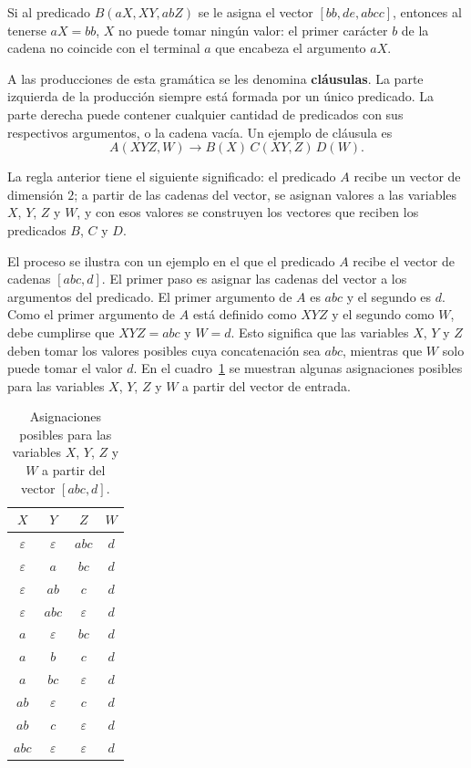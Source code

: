 \documentclass{report}
\theoremstyle{definition}
\theoremstyle{plain}
\theoremstyle{remark}
\begin{document}
Si al predicado $B(aX, XY, abZ)$ se le asigna el vector
$[bb, de, abcc]$, entonces al tenerse $aX = bb$, $X$ no puede tomar
ningún valor: el primer carácter $b$ de la cadena no coincide con el
terminal $a$ que encabeza el argumento $aX$. 

A las producciones de esta gramática se les denomina \textbf{cláusulas}.
La parte izquierda de la producción siempre está formada por un único
predicado. La parte derecha puede contener cualquier cantidad de
predicados con sus respectivos argumentos, o la cadena vacía. Un ejemplo
de cláusula es
\[
  A(XYZ, W) \to B(X)\, C(XY, Z)\, D(W).
\]

La regla anterior tiene el siguiente significado: el predicado $A$
recibe un vector de dimensión $2$; a partir de las cadenas del vector,
se asignan valores a las variables $X$, $Y$, $Z$ y $W$, y con esos
valores se construyen los vectores que reciben los predicados $B$, $C$
y $D$.

El proceso se ilustra con un ejemplo en el que el predicado $A$ recibe
el vector de cadenas $[abc, d]$. El primer paso es asignar las cadenas
del vector a los argumentos del predicado. El primer argumento de $A$
es $abc$ y el segundo es $d$. Como el primer argumento de $A$ está
definido como $XYZ$ y el segundo como $W$, debe cumplirse que $XYZ = abc$
y $W = d$. Esto significa que las variables $X$, $Y$ y $Z$ deben tomar
los valores posibles cuya concatenación sea $abc$, mientras que $W$ solo
puede tomar el valor $d$. En el cuadro~\ref{tab:valores-xyzw} se
muestran algunas asignaciones posibles para las variables $X$, $Y$, $Z$
y $W$ a partir del vector de entrada.

\begin{table}[ht]
  \centering
  \begin{tabular}{|c|c|c|c|}
    \hline
    $X$ & $Y$ & $Z$ & $W$ \\ \hline
    $\varepsilon$ & $\varepsilon$ & $abc$ & $d$ \\ \hline
    $\varepsilon$ & $a$ & $bc$ & $d$ \\ \hline
    $\varepsilon$ & $ab$ & $c$ & $d$ \\ \hline
    $\varepsilon$ & $abc$ & $\varepsilon$ & $d$ \\ \hline
    $a$ & $\varepsilon$ & $bc$ & $d$ \\ \hline
    $a$ & $b$ & $c$ & $d$ \\ \hline
    $a$ & $bc$ & $\varepsilon$ & $d$ \\ \hline
    $ab$ & $\varepsilon$ & $c$ & $d$ \\ \hline
    $ab$ & $c$ & $\varepsilon$ & $d$ \\ \hline
    $abc$ & $\varepsilon$ & $\varepsilon$ & $d$ \\ \hline
  \end{tabular}
  \caption{Asignaciones posibles para las variables $X$, $Y$, $Z$ y
  $W$ a partir del vector $[abc, d]$.}
  \label{tab:valores-xyzw}
\end{table}
\end{document}
